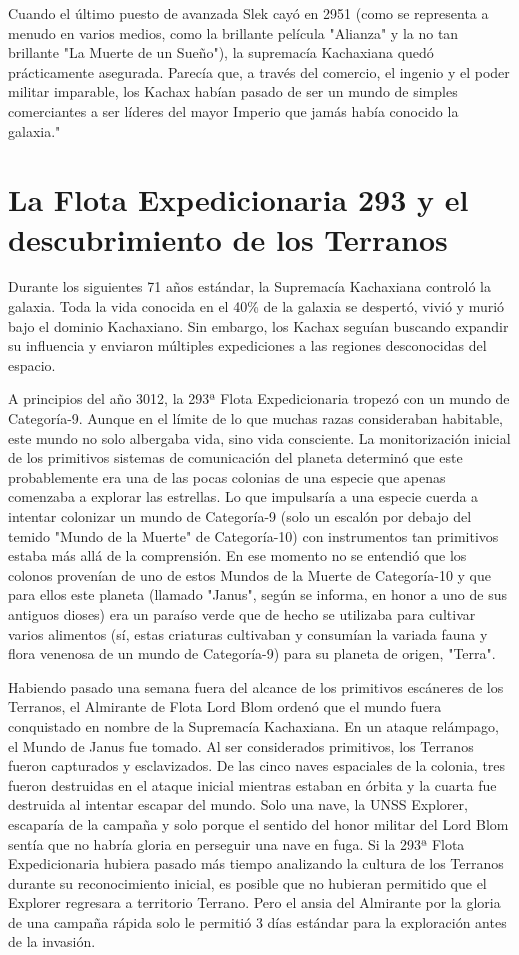 \documentclass[spanish,12pt,a4paper,oneside,titlepage, twocolumn]{article}
\begin{document}
    Cuando el último puesto de avanzada Slek cayó en 2951 (como se representa a menudo en varios medios, como la brillante película "Alianza" y la no tan brillante "La Muerte de un Sueño"), la supremacía Kachaxiana quedó prácticamente asegurada. Parecía que, a través del comercio, el ingenio y el poder militar imparable, los Kachax habían pasado de ser un mundo de simples comerciantes a ser líderes del mayor Imperio que jamás había conocido la galaxia."

    \section*{\centering La Flota Expedicionaria 293 y el descubrimiento de los Terranos}

    Durante los siguientes 71 años estándar, la Supremacía Kachaxiana controló la galaxia. Toda la vida conocida en el 40\% de la galaxia se despertó, vivió y murió bajo el dominio Kachaxiano. Sin embargo, los Kachax seguían buscando expandir su influencia y enviaron múltiples expediciones a las regiones desconocidas del espacio.

    A principios del año 3012, la 293ª Flota Expedicionaria tropezó con un mundo de Categoría-9. Aunque en el límite de lo que muchas razas consideraban habitable, este mundo no solo albergaba vida, sino vida consciente. La monitorización inicial de los primitivos sistemas de comunicación del planeta determinó que este probablemente era una de las pocas colonias de una especie que apenas comenzaba a explorar las estrellas. Lo que impulsaría a una especie cuerda a intentar colonizar un mundo de Categoría-9 (solo un escalón por debajo del temido "Mundo de la Muerte" de Categoría-10) con instrumentos tan primitivos estaba más allá de la comprensión. En ese momento no se entendió que los colonos provenían de uno de estos Mundos de la Muerte de Categoría-10 y que para ellos este planeta (llamado "Janus", según se informa, en honor a uno de sus antiguos dioses) era un paraíso verde que de hecho se utilizaba para cultivar varios alimentos (sí, estas criaturas cultivaban y consumían la variada fauna y flora venenosa de un mundo de Categoría-9) para su planeta de origen, "Terra".

    Habiendo pasado una semana fuera del alcance de los primitivos escáneres de los Terranos, el Almirante de Flota Lord Blom ordenó que el mundo fuera conquistado en nombre de la Supremacía Kachaxiana. En un ataque relámpago, el Mundo de Janus fue tomado. Al ser considerados primitivos, los Terranos fueron capturados y esclavizados. De las cinco naves espaciales de la colonia, tres fueron destruidas en el ataque inicial mientras estaban en órbita y la cuarta fue destruida al intentar escapar del mundo. Solo una nave, la UNSS Explorer, escaparía de la campaña y solo porque el sentido del honor militar del Lord Blom sentía que no habría gloria en perseguir una nave en fuga. Si la 293ª Flota Expedicionaria hubiera pasado más tiempo analizando la cultura de los Terranos durante su reconocimiento inicial, es posible que no hubieran permitido que el Explorer regresara a territorio Terrano. Pero el ansia del Almirante por la gloria de una campaña rápida solo le permitió 3 días estándar para la exploración antes de la invasión.
\end{document}
